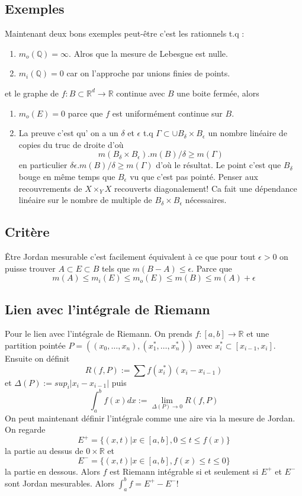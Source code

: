 \documentclass[a4paper,12pt]{book}
\newcommand{\R}{\mathbb{R}}
\newcommand{\Q}{\mathbb{Q}}
\theoremstyle{plain}
\theoremstyle{definition}
\theoremstyle{remark}
\begin{document}
\subsection{Exemples}
Maintenant deux bons exemples peut-être c'est les rationnels t.q :
\begin{enumerate}
  \item $m_o(\Q)=\infty$. Alros que la mesure de Lebesgue est nulle.
  \item $m_i(\Q)=0$ car on l'approche par unions finies de points.
\end{enumerate}
et le graphe de $f\colon B\subset \R^d\to \R$ continue avec $B$ une boite fermée, alors
\begin{enumerate}
  \item $m_o(E)=0$ parce que $f$ est uniformément continue sur $B$.
  \item La preuve c'est qu' on a un $\delta$ et $\epsilon$ t.q 
    $\Gamma\subset \cup B_\delta\times B_\epsilon$
    un nombre linéaire de copies du truc de droite d'où
    \[m(B_\delta\times B_\epsilon).m(B)/\delta\geq m(\Gamma)\]
    en particulier $\delta\epsilon.m(B)/\delta\geq m(\Gamma)$ d'où
    le résultat. Le point c'est que $B_\delta$ bouge en même temps
    que $B_\epsilon$ vu que c'est pas pointé. Penser aux recouvrements
    de $X\times_Y X$ recouverts diagonalement! Ca fait une dépendance 
    linéaire sur le nombre de multiple de $B_\delta\times B_\epsilon$
    nécessaires.
\end{enumerate}
\subsection{Critère}
Être Jordan mesurable c'est facilement équivalent à ce que
pour tout $\epsilon >0$ on puisse trouver $A\subset E\subset B$
tels que $m(B-A)\leq \epsilon$. Parce que
\[m(A)\leq m_i(E)\leq m_o(E)\leq m(B)\leq m(A)+\epsilon\]

\subsection{Lien avec l'intégrale de Riemann}
Pour le lien avec l'intégrale de Riemann. On prends $f\colon [a,b]\to \R$
et une partition pointée $P=((x_0,\ldots,x_n),(x_1^*,\ldots, x_n^*))$ avec
$x_i^*\subset [x_{i-1},x_i]$. Ensuite on définit
\[R(f,P):=\sum f(x_i^*)(x_i-x_{i-1})\]
et $\Delta(P):=sup_i |x_i-x_{i-1}|$ puis
\[\int_a^b f(x)dx:=\lim_{\Delta(P)\to 0} R(f,P)\]
On peut maintenant définir l'intégrale comme une aire via
la mesure de Jordan. On regarde
\[E^+=\{(x,t)|x\in [a,b],0\leq t\leq f(x)\}\]
la partie au dessus de $0\times \R$ 
et 
\[E^-=\{(x,t)|x\in [a,b],f(x)\leq t\leq 0\}\]
la partie en dessous. Alors $f$ est Riemann intégrable
si et seulement si $E^+$ et $E^-$ sont Jordan mesurables. Alors
$\int_a^b f=E^+-E^-$!
\end{document}
